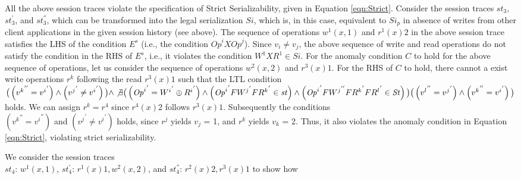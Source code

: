 \documentclass{sig-alternate-05-2015}
\begin{document}
 All the above session traces violate the specification of Strict Serializability, given in Equation
 \ref{eqn:Strict}. Consider the session traces $\mathit{st}_3$, $\mathit{st}_3^{'}$, and $\mathit{st}_3^{''}$, which can be transformed into the legal
 serialization $\mathit{Si}$, which is, in this case, equivalent to  $\mathit{Si}_p$ in absence of writes from other
 client applications in the given session history (see above). The sequence of operations $w^1(x,1)$ and
 $r^1(x){2}$ in the above session trace satisfies the LHS of the condition $E^s$ (i.e., the condition
 $\mathit{Op}^i X \mathit{Op}^j$). Since $v_i \not= v_j$, the above sequence of write and read operations
 do not satisfy the condition  in the RHS of $E^s$, i.e., it violates the condition $W^1 X R^1 \in \mathit{Si}$.
 For the anomaly condition $C$ to hold for the above sequence of operations, let us consider the
 sequence of operations $w^2(x,2)$ and $r^3(x)1$. For the RHS of $C$ to hold, there cannot a exist write operations $r^k$ following the read $r^3(x)1$ such that the
  LTL condition $\big(  \left( {v^k}^{''} = {v^i}^{'} \right) \wedge   \left( {v^j}^{'} \not= {v^i}^{'} \right) \big) \wedge
 \not\exists \big(  \left( {\mathit{Op}^i}^{'} = {W^i}^{'}  \oplus {R^i}^{'}  \right) \wedge  \left( {\mathit{Op}^i}^{'}  F {W^j}^{'} F  {R^k}^{'} \in \mathit{st} \right) \wedge \left( {\mathit{Op}^i}^{'} F {W^j}^{''}   F  {R^k}^{'}  F  {R^l}^{'} \in \mathit{St} \right) \big) \\
 \big(  \left( {v^l}^{''} = {v^j}^{'} \right) \wedge   \left( {v^k}^{''} = {v^i}^{'} \right) \big)$
 holds.
 We can assign $r^k = r^4$ since $r^4(x)2$ follows $r^3(x)1$. Subsequently the conditions \\ $\left( {v^k}^{''} = {v^i}^{''} \right)$
and $\left( {v^j}^{'} \not= {v^i}^{'} \right)$ holds, since $r^j$ yields $v_j$ = 1, and
 $r^k$ yields $v_k$ = 2.
 Thus, it also violates the anomaly condition in Equation \ref{eqn:Strict}, violating strict serializability.
 \par  We consider the session traces \\ $\mathit{st}_4$: $w^1(x,1)$, $\mathit{st}_4^{'}$: $r^1(x){1}, w^2(x,2)$, and
 $\mathit{st}_4^{''}$: $r^2(x){2}, r^3(x){1}$ to show how
\end{document}
